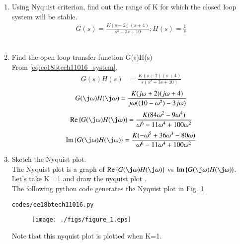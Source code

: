 \begin{enumerate}[label=\thesection.\arabic*.,ref=\thesection.\theenumi]
\item Using Nyquist criterion, find out the range of K for which the closed loop system will be stable.
\begin{align}
\label{eq:ee18btech11016_system}
 G(s)=\frac{K(s+2)(s+4)}{s^2-3s+10} ;  H(s) = \frac{1}{s}  
\end{align}
\\
\item Find the open loop transfer function G(s)H(s)
\\
\solution From \eqref{eq:ee18btech11016_system},
%
 \begin{align}
 \label{eq:ee18btech11016_system_equation}
G(s)H(s)&=\frac{K(s+2)(s+4)}{s(s^2-3s+10)}
 \end{align}
 \begin{align}
G(\j \omega)H(\j \omega)=\frac{K(j\omega+2)(j\omega+4)}{j\omega((10-\omega^2)-3j\omega)}
\end{align}
\begin{align}
 \text{Re} \cbrak{G(\j \omega)H(\j \omega)}=\frac{K(84\omega^2 - 9\omega^4)}{\omega^6-11\omega^4+100\omega^2} 
\end{align}
\begin{align}
 \text{Im} \cbrak{G(\j \omega)H(\j \omega)}=\frac{K(-\omega^5 + 36\omega^3-80\omega)}{\omega^6-11\omega^4+100\omega^2} 
\end{align}
%
\item Sketch the Nyquist plot.
\\
\solution The Nyquist plot is a graph of $\text{Re} \cbrak{G(\j \omega)H(\j \omega)}$  vs $\text{Im} \cbrak{G(\j \omega)H(\j \omega)}$.
Let's take K =1 and draw the nyquist plot . 
\\

The following python code generates the Nyquist plot in Fig.  \ref{fig:ee18btech11016}
\begin{lstlisting}
codes/ee18btech11016.py
\end{lstlisting}
%
\begin{figure}[!h]
  \texttt{[image: ./figs/figure\_1.eps]}
  \caption{}
  \label{fig:ee18btech11016}
\end{figure}
%
Note that this nyquist plot is plotted when K=1.
\\
 

\end{enumerate}
